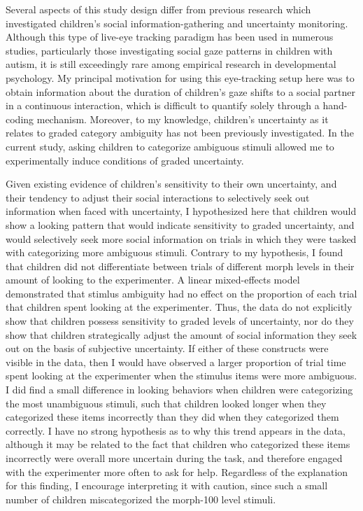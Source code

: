 \documentclass[floatsintext,man]{apa6}
\theoremstyle{definition}
\theoremstyle{definition}
\theoremstyle{definition}
\theoremstyle{remark}
\begin{document}
Several aspects of this study design differ from previous research which
investigated children's social information-gathering and uncertainty
monitoring. Although this type of live-eye tracking paradigm has been
used in numerous studies, particularly those investigating social gaze
patterns in children with autism, it is still exceedingly rare among
empirical research in developmental psychology. My principal motivation
for using this eye-tracking setup here was to obtain information about
the duration of children's gaze shifts to a social partner in a
continuous interaction, which is difficult to quantify solely through a
hand-coding mechanism. Moreover, to my knowledge, children's uncertainty
as it relates to graded category ambiguity has not been previously
investigated. In the current study, asking children to categorize
ambiguous stimuli allowed me to experimentally induce conditions of
graded uncertainty.

Given existing evidence of children's sensitivity to their own
uncertainty, and their tendency to adjust their social interactions to
selectively seek out information when faced with uncertainty, I
hypothesized here that children would show a looking pattern that would
indicate sensitivity to graded uncertainty, and would selectively seek
more social information on trials in which they were tasked with
categorizing more ambiguous stimuli. Contrary to my hypothesis, I found
that children did not differentiate between trials of different morph
levels in their amount of looking to the experimenter. A linear
mixed-effects model demonstrated that stimlus ambiguity had no effect on
the proportion of each trial that children spent looking at the
experimenter. Thus, the data do not explicitly show that children
possess sensitivity to graded levels of uncertainty, nor do they show
that children strategically adjust the amount of social information they
seek out on the basis of subjective uncertainty. If either of these
constructs were visible in the data, then I would have observed a larger
proportion of trial time spent looking at the experimenter when the
stimulus items were more ambiguous. I did find a small difference in
looking behaviors when children were categorizing the most unambiguous
stimuli, such that children looked longer when they categorized these
items incorrectly than they did when they categorized them correctly. I
have no strong hypothesis as to why this trend appears in the data,
although it may be related to the fact that children who categorized
these items incorrectly were overall more uncertain during the task, and
therefore engaged with the experimenter more often to ask for help.
Regardless of the explanation for this finding, I encourage interpreting
it with caution, since such a small number of children miscategorized
the morph-100 level stimuli.
\end{document}
